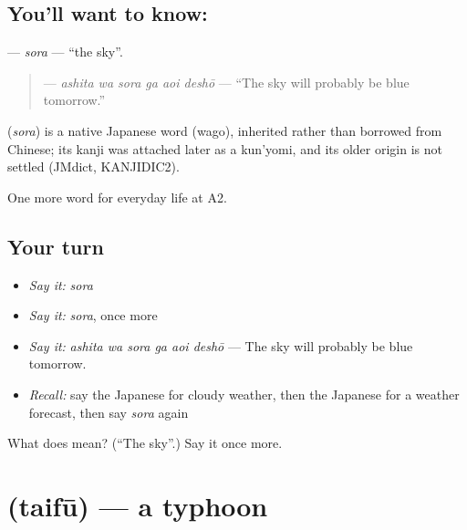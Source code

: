 \subsection*{You'll want to know: }
\textbf{} — \emph{sora} — \textquotedblleft{}the sky\textquotedblright{}.

\begin{quote}
\textbf{  } — \emph{ashita wa sora ga aoi deshō} — \textquotedblleft{}The sky will probably be blue tomorrow.\textquotedblright{}
\end{quote}

\begin{cousinweb}
\textbf{} (\emph{sora}) is a native Japanese word (wago), inherited rather than borrowed from Chinese; its kanji was attached later as a kun'yomi, and its older origin is not settled (JMdict, KANJIDIC2).
\end{cousinweb}

\begin{grammarlens}[title={What you've built}]
One more word for everyday life at A2.
\end{grammarlens}

\subsection*{Your turn}
\begin{itemize}
\raggedright
  \item \emph{Say it:} \emph{sora}
  \item \emph{Say it:} \emph{sora}, once more
  \item \emph{Say it:} \emph{ashita wa sora ga aoi deshō} — The sky will probably be blue tomorrow.
  \item \emph{Recall:} say the Japanese for cloudy weather, then the Japanese for a weather forecast, then say \emph{sora} again
\end{itemize}

\begin{tcolorbox}[breakable,colback=teal!4,colframe=teal!35!black,title={Before you move on}]
What does  mean? (\textquotedblleft{}The sky\textquotedblright{}.) Say it once more.
\end{tcolorbox}
\section[\texorpdfstring{\ja{たいふう} (taifū)}{たいふう (taifū)}]{ (taifū) — a typhoon}

